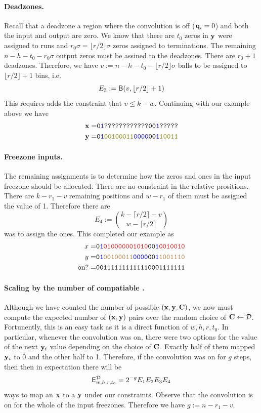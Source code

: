 \paragraph{Deadzones.} Recall that a deadzone a region where the convolution is off ($\mathbf{q}_i=0$) and both the input and output are zero. We know that there are $t_0$ zeros in $\mathbf{y}$ were assigned to runs and $r_0\sigma=\lfloor r/2\rfloor\sigma$ zeros assigned to terminations. The remaining $n-h-t_0-r_0\sigma$ output zeros must be assined to the deadzones. There are $r_0+1$ deadzones. Therefore, we have
$v:=n-h-t_0-\lfloor r/2\rfloor\sigma$ balls to be assigned to $\lfloor r/2\rfloor+1$ bins, i.e.
$$
E_3:= \mathsf{B}(v,\lfloor r/2\rfloor+1)
$$
This requires adds the constraint that $v\leq k-w$.
Continuing with our example above we have
\begin{align*}
    \xv=&\texttt{0\blue{1}????????????00\blue{1}?????}\\
    \yv=&\texttt{0\blue{1}\olive{00100011}\blue{0000}00\blue{1}\olive{10011}}
\end{align*}


\paragraph{Freezone inputs.} The remaining assignments is to determine how the zeros and ones in the input freezone should be allocated. There are no constraint in the relative prositions. There are $k-r_1-v$ remaining positions and $w-r_1$ of them must be assigned the value of 1. Therefore there are
$$
E_4:=\binom{k-\lceil r/2\rceil-v}{w-\lceil r/2\rceil}
$$
was to assign the ones. This completed our example as
\begin{align*}
    x= & \texttt{0\textcolor{blue}{1}\textcolor{red}{010000001010}00\textcolor{blue}{1}\textcolor{red}{0010010}}\\
    y= & \texttt{0\textcolor{blue}{1}\textcolor{brown}{00100011}\textcolor{blue}{0000}00\textcolor{blue}{1}\textcolor{brown}{1001110}}\\
    \text{on?}= & \texttt{001111111111110001111111}
\end{align*}


\paragraph{Scaling by the number of compatiable \C.} Although we have counted the number of possible $(\mathbf{x},\mathbf{y},\mathbf{C})$, we now must compute the expected number of $(\mathbf{x},\mathbf{y})$ pairs over the random choice of $\mathbf{C}\gets \mathcal{D}$. Fortunently, this is an easy task as it is a direct function of $w,h,r,t_0$. In particular, whenever the convolution was on, there were two options for the value of the next $\mathbf{y}_i$ value depending on the choice of $\mathbf{C}$. Exactly half of them mapped $\mathbf{y}_i$ to 0 and the other half to 1. Therefore, if the convolution was on for $g$ steps, then then in expectation there will be
$$
\mathsf{E}^\mathcal{D}_{w,h,r,t_0}=2^{-g}E_1E_2E_3E_4
$$
ways to map an $\mathbf{x}$ to a $\mathbf{y}$ under our constraints. Observe that the convolution is on for the whole of the input freezones. Therefore we have $g:=n-r_1-v$.


